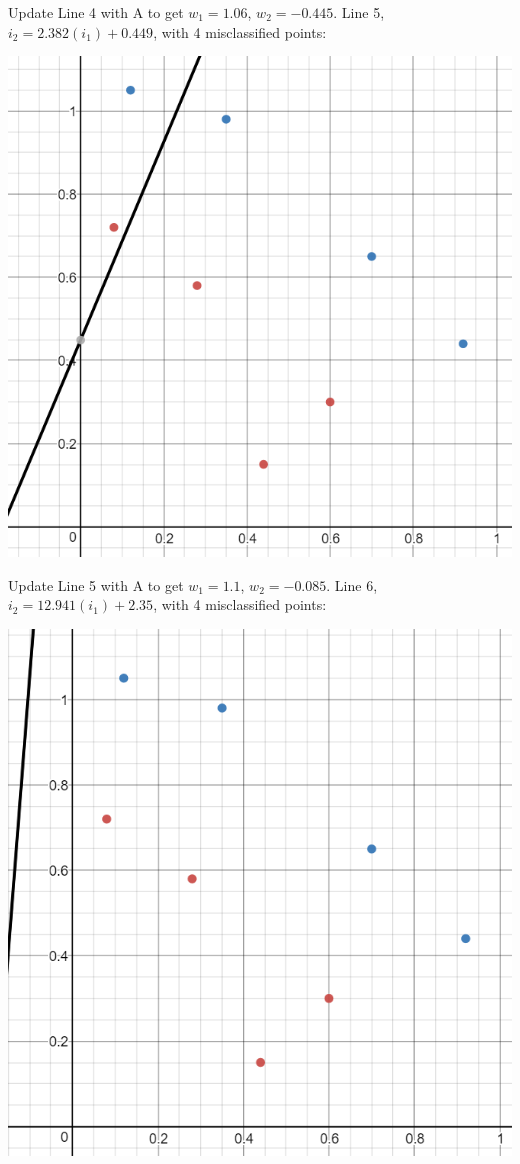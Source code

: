 \documentclass[12pt, letterpaper]{article}
\begin{document}
	\medskip 	
	Update Line 4 with A to get $w_1 = 1.06$, $w_2 = -0.445$. Line 5, $i_2 = 2.382(i_1) + 0.449$, with 4 misclassified points:
	\medskip
	
	\includegraphics[scale=0.6]{"Problem 4/Line 5"}
	
	\medskip 	
	Update Line 5 with A to get $w_1 = 1.1$, $w_2 = -0.085$. Line 6, $i_2 = 12.941(i_1) + 2.35$, with 4 misclassified points:
	\medskip

	\includegraphics[scale=0.6]{"Problem 4/Line 6"}	
	
\end{document}
